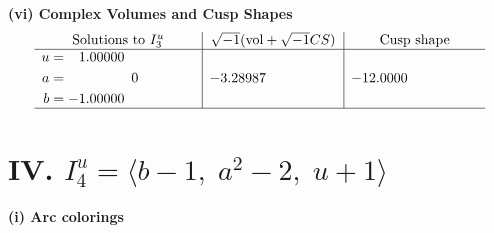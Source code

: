 \documentclass[1p]{elsarticle_modified}
\theoremstyle{definition}
\newcommand{\I}{\sqrt{-1}}
\begin{document}
\newpage\flushleft \textbf{(vi) Complex Volumes and Cusp Shapes}
$$\begin{array}{c|c|c}  
\text{Solutions to }I^u_{3}& \I (\text{vol} + \sqrt{-1}CS) & \text{Cusp shape}\\
 \hline 
\begin{aligned}
u &= \phantom{-}1.00000\phantom{ +0.000000I} \\
a &= \phantom{-0.000000 } 0 \\
b &= -1.00000\phantom{ +0.000000I}\end{aligned}
 & -3.28987\phantom{ +0.000000I} & -12.0000\phantom{ +0.000000I}\\
 \hline 
 \end{array}$$\newpage\newpage\renewcommand{\arraystretch}{1}
\centering \section*{IV. $I^u_{4}= \langle b-1,\;a^2-2,\;u+1 \rangle$}
\flushleft \textbf{(i) Arc colorings}\\
\end{document}
